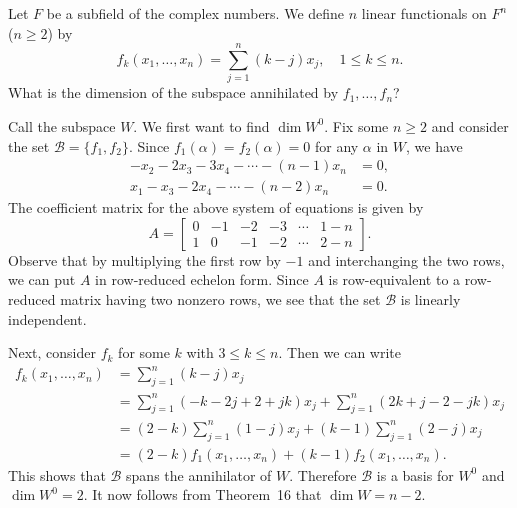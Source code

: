  Let $F$ be a subfield of the complex numbers. We define
$n$ linear functionals on $F^n$ ($n\geq2$) by
\begin{equation*}
  f_k(x_1,\dots,x_n) = \sum_{j=1}^n(k-j)x_j, \quad 1\leq k\leq n.
\end{equation*}
What is the dimension of the subspace annihilated by $f_1,\dots,f_n$?
\begin{solution}
  Call the subspace $W$. We first want to find $\dim W^0$. Fix some
  $n\geq2$ and consider the set $\mathcal{B} = \{f_1,f_2\}$. Since
  $f_1(\alpha) = f_2(\alpha) = 0$ for any $\alpha$ in $W$, we have
  \begin{align*}
    -x_2 - 2x_3 - 3x_4 - \cdots - (n - 1)x_n &= 0, \\
    x_1 - x_3 - 2x_4 - \cdots - (n - 2)x_n &= 0.
  \end{align*}
  The coefficient matrix for the above system of equations is given by
  \begin{equation*}
    A =
    \begin{bmatrix}
      0 & -1 & -2 & -3 & \cdots & 1 - n \\
      1 & 0 & -1 & -2 & \cdots & 2 - n
    \end{bmatrix}.
  \end{equation*}
  Observe that by multiplying the first row by $-1$ and interchanging
  the two rows, we can put $A$ in row-reduced echelon form. Since $A$
  is row-equivalent to a row-reduced matrix having two nonzero rows,
  we see that the set $\mathcal{B}$ is linearly independent.

  Next, consider $f_k$ for some $k$ with $3\leq k\leq n$. Then we can
  write
  \begin{align*}
    f_k(x_1,\dots,x_n)
    &= \sum_{j=1}^n(k-j)x_j \\
    &= \sum_{j=1}^n(-k - 2j + 2 + jk)x_j
      + \sum_{j=1}^n(2k + j - 2 - jk)x_j \\
    &= (2 - k)\sum_{j=1}^n(1 - j)x_j + (k - 1)\sum_{j=1}^n(2 - j)x_j \\
    &= (2 - k)f_1(x_1,\dots,x_n) + (k - 1)f_2(x_1,\dots,x_n).
  \end{align*}
  This shows that $\mathcal{B}$ spans the annihilator of
  $W$. Therefore $\mathcal{B}$ is a basis for $W^0$ and
  $\dim W^0 = 2$. It now follows from Theorem~16 that
  $\dim W = n - 2$.
\end{solution}

